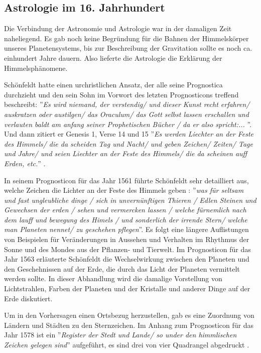 \documentclass[12pt]{article}
\begin{document}
\subsection{Astrologie im 16. Jahrhundert}
\label{sec_schoenfeldt_astrologie}

Die Verbindung der Astronomie und Astrologie war in der damaligen Zeit naheliegend. Es gab noch keine Begründung für die Bahnen der Himmelskörper unseres Planetensystems, bis zur Beschreibung der Gravitation sollte es noch ca. einhundert Jahre dauern. Also lieferte die Astrologie die Erklärung der Himmelsphänomene.

Schönfeldt hatte einen urchristlichen Ansatz, der alle seine Prognostica durchzieht und den sein Sohn im Vorwort des letzten Prognosticons treffend beschreibt: ''\emph{Es wird niemand, der verstendig/ und dieser Kunst recht erfahren/ auskratzen oder austilgen/ das Oraculum/ das Gott selbst lassen erschallen und verlauten baldt am anfang seiner Prophetischen Bücher / da er also spricht:... }''. Und dann zitiert er Genesis 1, Verse 14 und 15 ''\emph{Es werden Liechter an der Feste des Himmels/ die da scheiden Tag und Nacht/ und geben Zeichen/ Zeiten/ Tage und Jahre/ und seien Liechter an der Feste des Himmels/ die da scheinen auff Erden, etc.}'' \cite{Schoenfeldt1591a}.

In seinem Prognosticon für das Jahr 1561 führte Schönfeldt sehr detailliert aus, welche Zeichen die Lichter an der Feste des Himmels geben \cite{Schoenfeldt1560}: ''\emph{was für seltsam und fast ungleubliche dinge / sich in unvernünftigen Thieren / Edlen Steinen und Gewechsen der erden / sehen und vermercken lassen / welche fürnemlich nach dem lauff und bewegung des Himels / und sonderlich der irrende Stern/ welche man Planeten nennet/ zu geschehen pflegen}''. Es folgt eine längere Auflistungen von Beispielen für Veränderungen in Aussehen und Verhalten im Rhythmus der Sonne und des Mondes aus der Pflanzen- und Tierwelt. Im Prognosticon für das Jahr 1563 \cite{Schoenfeldt1562} erläuterte Schönfeldt die Wechselwirkung zwischen den Planeten und den Geschehnissen auf der Erde, die durch das Licht der Planeten vermittelt werden sollte. 
In dieser Abhandlung wird die damalige Vorstellung von Lichtstrahlen, Farben der Planeten und der Kristalle und anderer Dinge auf der Erde diskutiert.

Um in den Vorhersagen einen Ortsbezug herzustellen, gab es eine Zuordnung von Ländern und Städten zu den Sternzeichen. Im Anhang zum Prognosticon für das Jahr 1578 ist ein ''\emph{Register der Stedt und Lande/ so under den himmlischen Zeichen gelegen sind}'' aufgeführt, es sind drei von vier Quadrangel abgedruckt \cite{Schoenfeldt1578}.
\end{document}
